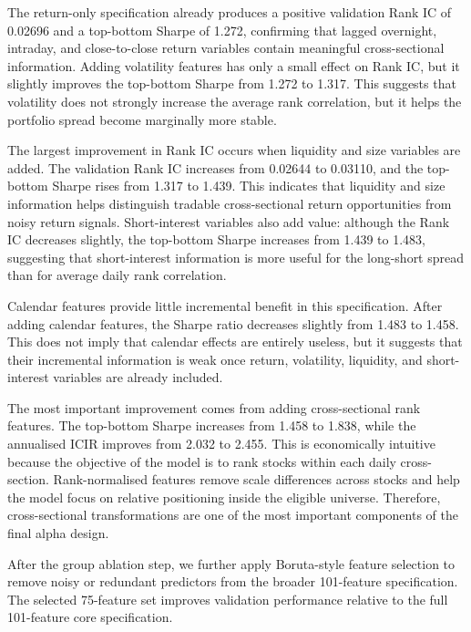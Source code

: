 \documentclass[12pt]{article}
\begin{document}
The return-only specification already produces a positive validation Rank IC of 0.02696 and a top-bottom Sharpe of 1.272, confirming that lagged overnight, intraday, and close-to-close return variables contain meaningful cross-sectional information. Adding volatility features has only a small effect on Rank IC, but it slightly improves the top-bottom Sharpe from 1.272 to 1.317. This suggests that volatility does not strongly increase the average rank correlation, but it helps the portfolio spread become marginally more stable.

The largest improvement in Rank IC occurs when liquidity and size variables are added. The validation Rank IC increases from 0.02644 to 0.03110, and the top-bottom Sharpe rises from 1.317 to 1.439. This indicates that liquidity and size information helps distinguish tradable cross-sectional return opportunities from noisy return signals. Short-interest variables also add value: although the Rank IC decreases slightly, the top-bottom Sharpe increases from 1.439 to 1.483, suggesting that short-interest information is more useful for the long-short spread than for average daily rank correlation.

Calendar features provide little incremental benefit in this specification. After adding calendar features, the Sharpe ratio decreases slightly from 1.483 to 1.458. This does not imply that calendar effects are entirely useless, but it suggests that their incremental information is weak once return, volatility, liquidity, and short-interest variables are already included.

The most important improvement comes from adding cross-sectional rank features. The top-bottom Sharpe increases from 1.458 to 1.838, while the annualised ICIR improves from 2.032 to 2.455. This is economically intuitive because the objective of the model is to rank stocks within each daily cross-section. Rank-normalised features remove scale differences across stocks and help the model focus on relative positioning inside the eligible universe. Therefore, cross-sectional transformations are one of the most important components of the final alpha design.

After the group ablation step, we further apply Boruta-style feature selection to remove noisy or redundant predictors from the broader 101-feature specification. The selected 75-feature set improves validation performance relative to the full 101-feature core specification.
\end{document}
